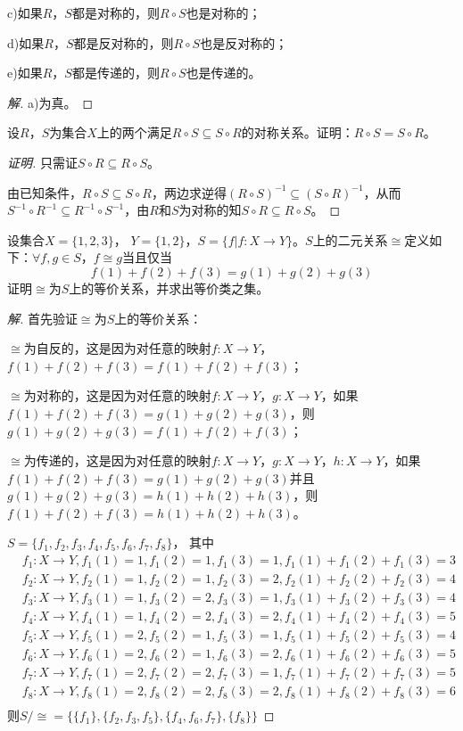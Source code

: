 \documentclass{article}
\begin{document}
\begin{CJK}{UTF8}{gbsn}
\begin{Exercise}
  c)如果$R$，$S$都是对称的，则$R\circ S$也是对称的；

  d)如果$R$，$S$都是反对称的，则$R\circ S$也是反对称的；


  e)如果$R$，$S$都是传递的，则$R\circ S$也是传递的。
\end{Exercise}
\begin{proof}[解]
  a)为真。
\end{proof}
\begin{Exercise}
设$R$，$S$为集合$X$上的两个满足$R\circ S\subseteq S\circ R$的对称关系。证明：$R\circ S= S\circ R$。
\end{Exercise}
  \begin{proof}[证明]
    只需证$S\circ R\subseteq R\circ S$。

    由已知条件，$R\circ S\subseteq S\circ R$，两边求逆得$(R\circ S)^{-1}\subseteq (S\circ R)^{-1}$，从而$S^{-1}\circ R^{-1}\subseteq R^{-1}\circ S^{-1}$，由$R$和$S$为对称的知$S\circ R\subseteq R\circ S$。
  \end{proof}
  \begin{Exercise}
    设集合$X = \{1,2,3\}$， $Y = \{1,2\}$，$S = \{f|f:X \to Y\}$。$S$上的二元关系$\cong$定义如下：$\forall f,g\in S$，$f \cong g$当且仅当\[f(1) + f(2) + f(3) = g(1) + g(2) + g(3)\]证明$\cong$为$S$上的等价关系，并求出等价类之集。    
  \end{Exercise}
  \begin{proof}[解]
    首先验证$\cong$为$S$上的等价关系：
    
    $\cong$为自反的，这是因为对任意的映射$f:X\to Y$，$f(1)+f(2)+f(3)=f(1)+f(2)+f(3)$；

    $\cong$为对称的，这是因为对任意的映射$f:X\to Y$，$g:X\to Y$，如果$f(1)+f(2)+f(3)=g(1)+g(2)+g(3)$，则$g(1)+g(2)+g(3)=f(1)+f(2)+f(3)$；

    $\cong$为传递的，这是因为对任意的映射$f:X\to Y$，$g:X\to Y$，$h:X\to Y$，如果$f(1)+f(2)+f(3)=g(1)+g(2)+g(3)$并且$g(1)+g(2)+g(3)=h(1)+h(2)+h(3)$，则$f(1)+f(2)+f(3)=h(1)+h(2)+h(3)$。
    
    $S=\{f_1,f_2,f_3,f_4,f_5,f_6,f_7,f_8\}$，
    其中
    \begin{align*}
      &f_1:X\to Y, f_1(1)=1,f_1(2)=1,f_1(3) = 1, f_1(1)+f_1(2)+f_1(3)=3\\
      &f_2:X\to Y, f_2(1)=1,f_2(2)=1,f_2(3) = 2, f_2(1)+f_2(2)+f_2(3)=4\\
      &f_3:X\to Y, f_3(1)=1,f_3(2)=2,f_3(3) = 1, f_3(1)+f_3(2)+f_3(3)=4\\
      &f_4:X\to Y, f_4(1)=1,f_4(2)=2,f_4(3) = 2,f_4(1)+f_4(2)+f_4(3)=5\\
      &f_5:X\to Y, f_5(1)=2,f_5(2)=1,f_5(3) = 1, f_5(1)+f_5(2)+f_5(3)=4\\
      &f_6:X\to Y, f_6(1)=2,f_6(2)=1,f_6(3) = 2, f_6(1)+f_6(2)+f_6(3)=5\\
      &f_7:X\to Y, f_7(1)=2,f_7(2)=2,f_7(3) = 1,f_7(1)+f_7(2)+f_7(3)=5\\
      &f_8:X\to Y, f_8(1)=2,f_8(2)=2,f_8(3) = 2, f_8(1)+f_8(2)+f_8(3)=6\\
    \end{align*}
    则$S/\cong=\{\{f_1\},\{f_2,f_3,f_5\},\{f_4,f_6,f_7\},\{f_8\}\}$
  \end{proof}


\end{CJK}
\end{document}
